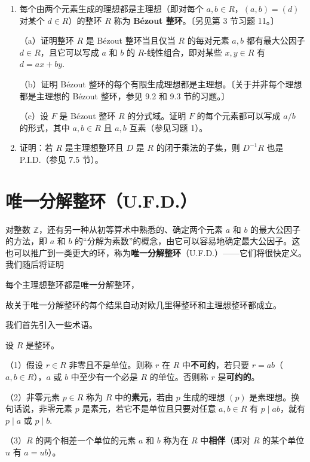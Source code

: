 \begin{enumerate}
\item 每个由两个元素生成的理想都是主理想（即对每个 \(a, b \in R\)，\((a, b) = (d)\) 对某个 \(d \in R\)）的整环 \(R\) 称为 \textbf{Bézout 整环}。〔另见第 3 节习题 11。〕

（a）证明整环 \(R\) 是 Bézout 整环当且仅当 \(R\) 的每对元素 \(a, b\) 都有最大公因子 \(d \in R\)，且它可以写成 \(a\) 和 \(b\) 的 \(R\)-线性组合，即对某些 \(x, y \in R\) 有 \(d = ax+by\).

（b）证明 Bézout 整环的每个有限生成理想都是主理想。〔关于并非每个理想都是主理想的 Bézout 整环，参见 9.2 和 9.3 节的习题。〕

（c）设 \(F\) 是 Bézout 整环 \(R\) 的分式域。证明 \(F\) 的每个元素都可以写成 \(a/b\) 的形式，其中 \(a, b \in R\) 且 \(a, b\) 互素（参见习题 1）。

\item 证明：若 \(R\) 是主理想整环且 \(D\) 是 \(R\) 的闭于乘法的子集，则 \(D^{-1}R\) 也是 P.I.D.（参见 7.5 节）。
\end{enumerate}

\section{唯一分解整环（U.F.D.）}

对整数 \(\mathbb{Z}\)，还有另一种从初等算术中熟悉的、确定两个元素 \(a\) 和 \(b\) 的最大公因子的方法，即 \(a\) 和 \(b\) 的“分解为素数”的概念，由它可以容易地确定最大公因子。这也可以推广到一类更大的环，称为\textbf{唯一分解整环}（U.F.D.）——它们将很快定义。我们随后将证明
\begin{center}
每个主理想整环都是唯一分解整环，
\end{center}
故关于唯一分解整环的每个结果自动对欧几里得整环和主理想整环都成立。

我们首先引入一些术语。

\begin{definition}
设 \(R\) 是整环。

（1）假设 \(r \in R\) 非零且不是单位。则称 \(r\) 在 \(R\) 中\textbf{不可约}，若只要 \(r = ab\)（\(a, b \in R\)），\(a\) 或 \(b\) 中至少有一个必是 \(R\) 的单位。否则称 \(r\) 是\textbf{可约的}。

（2）非零元素 \(p \in R\) 称为 \(R\) 中的\textbf{素元}，若由 \(p\) 生成的理想 \((p)\) 是素理想。换句话说，非零元素 \(p\) 是素元，若它不是单位且只要对任意 \(a, b \in R\) 有 \(p \mid ab\)，就有 \(p \mid a\) 或 \(p \mid b\).

（3）\(R\) 的两个相差一个单位的元素 \(a\) 和 \(b\) 称为在 \(R\) 中\textbf{相伴}（即对 \(R\) 的某个单位 \(u\) 有 \(a = ub\)）。
\end{definition}

